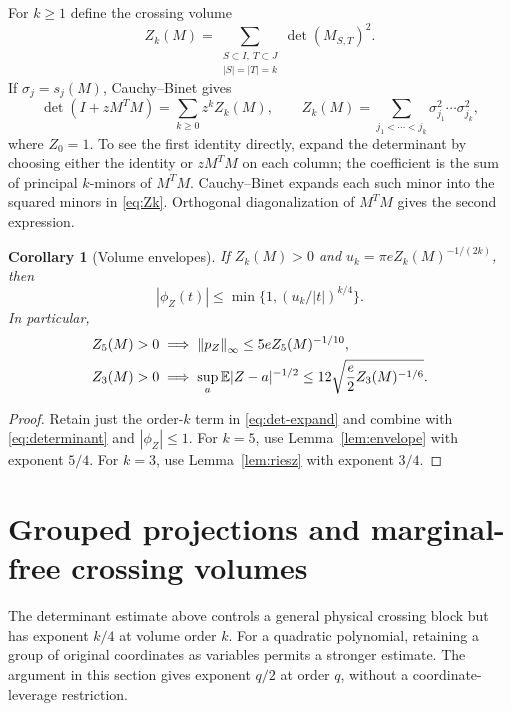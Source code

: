 \documentclass[11pt]{article}
\numberwithin{equation}{section}
\newtheorem{corollary}[theorem]{Corollary}
\theoremstyle{definition}\newtheorem{definition}[theorem]{Definition}
\theoremstyle{remark}\newtheorem{remark}[theorem]{Remark}
\newcommand{\1}{\mathbf 1}\newcommand{\diag}{\operatorname{diag}}
\newcommand{\norm}[1]{\left\lVert#1\right\rVert}\newcommand{\abs}[1]{\left|#1\right|}
\begin{document}
For $k\ge1$ define the crossing volume
\begin{equation}\label{eq:Zk}
 Z_k(M)=\sum_{\substack{S\subset I,\ T\subset J\\|S|=|T|=k}}\det(M_{S,T})^2.
\end{equation}
If $\sigma_j=s_j(M)$, Cauchy--Binet gives
\begin{equation}\label{eq:det-expand}
 \det(I+zM^TM)=\sum_{k\ge0}z^k Z_k(M),\qquad
 Z_k(M)=\sum_{j_1<\cdots<j_k}\sigma_{j_1}^2\cdots\sigma_{j_k}^2,
\end{equation}
where $Z_0=1$. To see the first identity directly, expand the determinant by choosing either the identity or $zM^TM$ on each column; the coefficient is the sum of principal $k$-minors of $M^TM$. Cauchy--Binet expands each such minor into the squared minors in \eqref{eq:Zk}. Orthogonal diagonalization of $M^TM$ gives the second expression.

\begin{corollary}[Volume envelopes]\label{cor:vol-fourier}
If $Z_k(M)>0$ and $u_k=\pi e Z_k(M)^{-1/(2k)}$, then
\begin{equation}\label{eq:vol-envelope}
 |\phi_Z(t)|\le\min\{1,(u_k/|t|)^{k/4}\}.
\end{equation}
In particular,
\begin{align}
 Z_5(M)>0&\implies \norm{p_Z}_\infty\le5e Z_5(M)^{-1/10},\label{eq:five-volume}\\
 Z_3(M)>0&\implies \sup_a\E|Z-a|^{-1/2}
 \le12\sqrt{\frac e2 Z_3(M)^{-1/6}}.\label{eq:three-volume}
\end{align}
\end{corollary}
\begin{proof}
Retain just the order-$k$ term in \eqref{eq:det-expand} and combine with \eqref{eq:determinant} and $|\phi_Z|\le1$. For $k=5$, use Lemma~\ref{lem:envelope} with exponent $5/4$. For $k=3$, use Lemma~\ref{lem:riesz} with exponent $3/4$.
\end{proof}

\section{Grouped projections and marginal-free crossing volumes}\label{sec:grouped}
The determinant estimate above controls a general physical crossing block but has exponent $k/4$ at volume order $k$. For a quadratic polynomial, retaining a group of original coordinates as variables permits a stronger estimate. The argument in this section gives exponent $q/2$ at order $q$, without a coordinate-leverage restriction.
\end{document}
